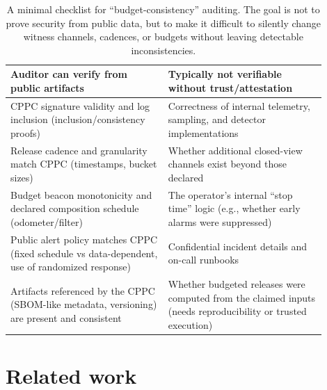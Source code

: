 \documentclass[11pt]{article}
\begin{document}
\begin{table}[t]
\centering
\begin{tabular}{@{}p{0.45\linewidth}p{0.45\linewidth}@{}}
\toprule
\textbf{Auditor can verify from public artifacts} & \textbf{Typically not verifiable without trust/attestation} \\
\midrule
CPPC signature validity and log inclusion (inclusion/consistency proofs)~\cite{rfc9162_ct,tomescu2019transparencylogs,newman2022sigstore} & Correctness of internal telemetry, sampling, and detector implementations \\
Release cadence and granularity match CPPC (timestamps, bucket sizes) & Whether additional closed-view channels exist beyond those declared \\
Budget beacon monotonicity and declared composition schedule (odometer/filter) & The operator's internal ``stop time'' logic (e.g., whether early alarms were suppressed) \\
Public alert policy matches CPPC (fixed schedule vs data-dependent, use of randomized response) & Confidential incident details and on-call runbooks \\
Artifacts referenced by the CPPC (SBOM-like metadata, versioning) are present and consistent~\cite{spdx_spec301,slsa_spec_v10,in_toto2019} & Whether budgeted releases were computed from the claimed inputs (needs reproducibility or trusted execution) \\
\bottomrule
\end{tabular}
\caption{A minimal checklist for ``budget-consistency'' auditing. The goal is not to prove security from public data, but to make it difficult to silently change witness channels, cadences, or budgets without leaving detectable inconsistencies.}
\label{tab:auditor-checklist}
\end{table}


\section{Related work}
\end{document}
